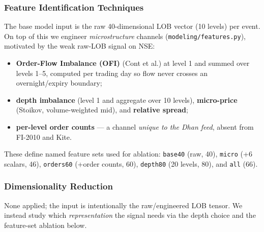 \documentclass[11pt]{article}
\begin{document}
\subsubsection{Feature Identification Techniques}
The base model input is the raw 40-dimensional LOB vector (10 levels) per event. On top of this we engineer
\emph{microstructure} channels (\texttt{modeling/features.py}), motivated by the weak raw-LOB signal on NSE:
\begin{itemize}[nosep]
  \item \textbf{Order-Flow Imbalance (OFI)} (Cont et al.) at level 1 and summed over levels 1--5, computed
        per trading day so flow never crosses an overnight/expiry boundary;
  \item \textbf{depth imbalance} (level 1 and aggregate over 10 levels), \textbf{micro-price}
        (Stoikov, volume-weighted mid), and \textbf{relative spread};
  \item \textbf{per-level order counts} --- a channel \emph{unique to the Dhan feed}, absent from FI-2010 and Kite.
\end{itemize}
These define named feature sets used for ablation: \texttt{base40} (raw, 40), \texttt{micro} (+6 scalars, 46),
\texttt{orders60} (+order counts, 60), \texttt{depth80} (20 levels, 80), and \texttt{all} (66).

\subsubsection{Dimensionality Reduction}
None applied; the input is intentionally the raw/engineered LOB tensor. We instead study which
\emph{representation} the signal needs via the depth choice and the feature-set ablation below.
\end{document}
